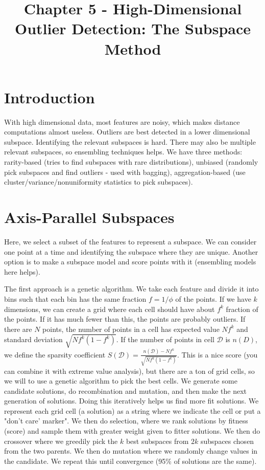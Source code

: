 \documentclass[a4paper]{article}
\title{Chapter 5 - High-Dimensional Outlier Detection: The Subspace Method}
\date{}
\begin{document}
\maketitle

\section{Introduction}
With high dimensional data, most features are noisy, which makes distance
computations almost useless. Outliers are best detected in a lower dimensional
subspace. Identifying the relevant subspaces is hard. There may also be
multiple relevant subspaces, so ensembling techniques helps. We have three
methods: rarity-based (tries to find subspaces with rare distributions),
unbiased (randomly pick subspaces and find outliers - used with bagging),
aggregation-based (use cluster/variance/nonuniformity statistics to pick
subspaces).

\section{Axis-Parallel Subspaces}
Here, we select a subset of the features to represent a subspace. We can
consider one point at a time and identifying the subspace where they are
unique. Another option is to make a subspace model and score points with it
(ensembling models here helps).

The first approach is a genetic algorithm. We take each feature and divide it
into bins such that each bin has the same fraction $f = 1/\phi$ of the points.
If we have $k$ dimensions, we can create a grid where each cell should have
about $f^k$ fraction of the points. If it has much fewer than this, the points
are probably outliers. If there are $N$ points, the number of points in a cell
has expected value $Nf^k$ and standard deviation $\sqrt{Nf^k (1 - f^k)}$. If
the number of points in cell $\mathcal{D}$ is $n(D)$, we define the sparsity
coefficient $S(\mathcal{D}) = \frac{n(\mathcal{D}) - Nf^k}{\sqrt{Nf^k (1 - f^k)}}$.
This is a nice score (you can combine it with extreme value analysis), but
there are a ton of grid cells, so we will to use a genetic algorithm to pick
the best cells. We generate some candidate solutions, do recombination and
mutation, and then make the next generation of solutions. Doing this iteratively
helps us find more fit solutions. We represent each grid cell (a solution) as a
string where we indicate the cell or put a "don't care' marker". We then do
selection, where we rank solutions by fitness (score) and sample them with
greater weight given to fitter solutions. We then do crossover where we greedily
pick the $k$ best subspaces from $2k$ subspaces chosen from the two parents. We
then do mutation where we randomly change values in the candidate. We repeat
this until convergence (95\% of solutions are the same).
\end{document}
